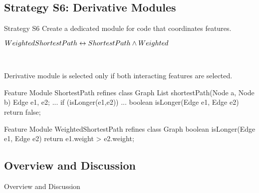 \subsection{Strategy S6: Derivative Modules}

\begin{frame}{\myframetitle}
	\begin{mycolumns}[widths={30},animation=none]
		\begin{definition}{Strategy S6}
			Create a dedicated module for code that coordinates features.
		\end{definition}
	\mynextcolumn
	\end{mycolumns}
\end{frame}

\begin{frame}[fragile]{\myframetitle}
	\begin{mycolumns}[animation=none]
		\centering

		$WeightedShortestPath \leftrightarrow ShortestPath \wedge Weighted$

		~
		\begin{note}{}
			Derivative module is selected only if both interacting features are selected.
		\end{note}
	\mynextcolumn
\begin{codetight}{Feature Module ShortestPath}
refines class Graph {
	List shortestPath(Node a, Node b){
		Edge e1, e2;
		...
		if (isLonger(e1,e2)) 
		... 
	}
	boolean isLonger(Edge e1, Edge e2){
		return false;
	}
}
\end{codetight}	
\begin{codetight}{Feature Module WeightedShortestPath}
refines class Graph {
	boolean isLonger(Edge e1, Edge e2){
		return e1.weight > e2.weight;
	}
}
\end{codetight}	
	\end{mycolumns}
\end{frame}

\subsection{Overview and Discussion}

\begin{frame}{Overview and Discussion}
	\centering{} %
\end{frame}
